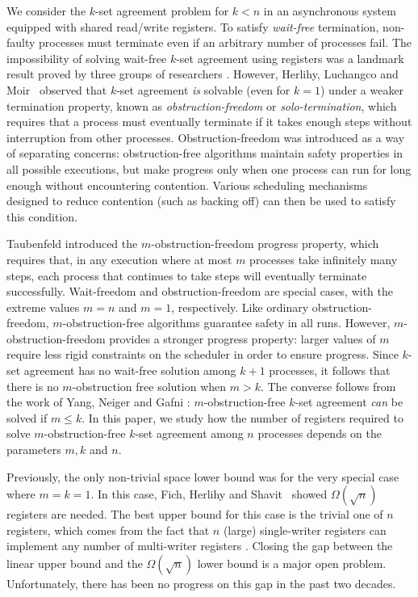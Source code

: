\documentclass[11pt]{article}
\begin{document}
We consider the $k$-set agreement problem for $k<n$ in an asynchronous 
system equipped with shared read/write registers.
To satisfy {\it wait-free} termination, non-faulty processes
must terminate even if an arbitrary number of processes fail.
The impossibility of solving wait-free $k$-set agreement using registers was a 
landmark result proved by three groups of researchers \cite{BG93b,HS99,SZ00}.
However, Herlihy, Luchangco and Moir~\cite{HLM03} observed that
$k$-set agreement {\it is} solvable (even for $k=1$)
under a weaker termination property, known as {\it obstruction-freedom}
or {\it solo-termination}, which requires that a process must eventually
terminate if it  takes enough steps without
interruption from other processes.
Obstruction-freedom was introduced as a way of separating concerns:
obstruction-free algorithms maintain safety properties in
all possible executions, but make progress only when one process can
run for long enough without encountering contention.
Various scheduling mechanisms designed to reduce contention (such as backing off)
can then be used to satisfy this condition.


Taubenfeld \cite{Tau09a} introduced the $m$-obstruction-freedom
progress property, which requires that, in any execution where
at most $m$ processes take infinitely many steps, each process
that continues to take steps will eventually terminate successfully.
Wait-freedom and obstruction-freedom are special cases,
with the extreme values $m=n$ and $m=1$, respectively.
Like ordinary obstruction-freedom, $m$-obstruction-free
algorithms guarantee safety in all runs.  However, $m$-obstruction-freedom
provides a stronger progress property:  larger values 
of $m$ require less rigid constraints on the scheduler
in order to ensure progress.
Since $k$-set agreement has no wait-free solution among $k+1$
processes, it follows that there is no $m$-obstruction free solution when 
$m>k$.
The converse follows from the work of Yang, Neiger and Gafni \cite{YNG98}:
$m$-obstruction-free $k$-set agreement {\it can} be solved 
if $m\leq k$.
In this paper, we study how the number of registers required to
solve $m$-obstruction-free $k$-set agreement among $n$ processes
depends on the parameters $m,k$ and $n$.

Previously, the only non-trivial space lower bound was for the
very special case where $m=k=1$.  In this case,
Fich, Herlihy and Shavit~\cite{FHS98} showed $\Omega(\sqrt{n})$
registers are needed.  
The best upper bound for this case is the trivial one of $n$ registers,
which comes from the fact that $n$ (large) single-writer registers
can implement any number of multi-writer registers \cite{VA86}.
Closing the gap between the linear upper bound and the $\Omega(\sqrt{n})$ 
lower bound is a major open problem.  Unfortunately, there has been no progress on this gap in the past two decades.
\end{document}
